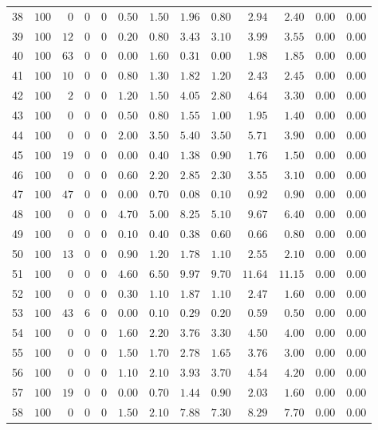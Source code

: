 \documentclass{article}
\begin{document}
\begin{landscape}
\begin{longtable}{lrrrrrrrrrrrr}
38&$100$&$ 0$&$ 0$&$ 0$&$0.50$&$1.50$&$ 1.96$&$ 0.80$&$ 2.94$&$ 2.40$&$0.00$&$0.00$\\
39&$100$&$12$&$ 0$&$ 0$&$0.20$&$0.80$&$ 3.43$&$ 3.10$&$ 3.99$&$ 3.55$&$0.00$&$0.00$\\
40&$100$&$63$&$ 0$&$ 0$&$0.00$&$1.60$&$ 0.31$&$ 0.00$&$ 1.98$&$ 1.85$&$0.00$&$0.00$\\
41&$100$&$10$&$ 0$&$ 0$&$0.80$&$1.30$&$ 1.82$&$ 1.20$&$ 2.43$&$ 2.45$&$0.00$&$0.00$\\
42&$100$&$ 2$&$ 0$&$ 0$&$1.20$&$1.50$&$ 4.05$&$ 2.80$&$ 4.64$&$ 3.30$&$0.00$&$0.00$\\
43&$100$&$ 0$&$ 0$&$ 0$&$0.50$&$0.80$&$ 1.55$&$ 1.00$&$ 1.95$&$ 1.40$&$0.00$&$0.00$\\
44&$100$&$ 0$&$ 0$&$ 0$&$2.00$&$3.50$&$ 5.40$&$ 3.50$&$ 5.71$&$ 3.90$&$0.00$&$0.00$\\
45&$100$&$19$&$ 0$&$ 0$&$0.00$&$0.40$&$ 1.38$&$ 0.90$&$ 1.76$&$ 1.50$&$0.00$&$0.00$\\
46&$100$&$ 0$&$ 0$&$ 0$&$0.60$&$2.20$&$ 2.85$&$ 2.30$&$ 3.55$&$ 3.10$&$0.00$&$0.00$\\
47&$100$&$47$&$ 0$&$ 0$&$0.00$&$0.70$&$ 0.08$&$ 0.10$&$ 0.92$&$ 0.90$&$0.00$&$0.00$\\
48&$100$&$ 0$&$ 0$&$ 0$&$4.70$&$5.00$&$ 8.25$&$ 5.10$&$ 9.67$&$ 6.40$&$0.00$&$0.00$\\
49&$100$&$ 0$&$ 0$&$ 0$&$0.10$&$0.40$&$ 0.38$&$ 0.60$&$ 0.66$&$ 0.80$&$0.00$&$0.00$\\
50&$100$&$13$&$ 0$&$ 0$&$0.90$&$1.20$&$ 1.78$&$ 1.10$&$ 2.55$&$ 2.10$&$0.00$&$0.00$\\
51&$100$&$ 0$&$ 0$&$ 0$&$4.60$&$6.50$&$ 9.97$&$ 9.70$&$11.64$&$11.15$&$0.00$&$0.00$\\
52&$100$&$ 0$&$ 0$&$ 0$&$0.30$&$1.10$&$ 1.87$&$ 1.10$&$ 2.47$&$ 1.60$&$0.00$&$0.00$\\
53&$100$&$43$&$ 6$&$ 0$&$0.00$&$0.10$&$ 0.29$&$ 0.20$&$ 0.59$&$ 0.50$&$0.00$&$0.00$\\
54&$100$&$ 0$&$ 0$&$ 0$&$1.60$&$2.20$&$ 3.76$&$ 3.30$&$ 4.50$&$ 4.00$&$0.00$&$0.00$\\
55&$100$&$ 0$&$ 0$&$ 0$&$1.50$&$1.70$&$ 2.78$&$ 1.65$&$ 3.76$&$ 3.00$&$0.00$&$0.00$\\
56&$100$&$ 0$&$ 0$&$ 0$&$1.10$&$2.10$&$ 3.93$&$ 3.70$&$ 4.54$&$ 4.20$&$0.00$&$0.00$\\
57&$100$&$19$&$ 0$&$ 0$&$0.00$&$0.70$&$ 1.44$&$ 0.90$&$ 2.03$&$ 1.60$&$0.00$&$0.00$\\
58&$100$&$ 0$&$ 0$&$ 0$&$1.50$&$2.10$&$ 7.88$&$ 7.30$&$ 8.29$&$ 7.70$&$0.00$&$0.00$\\

\end{longtable}
\end{landscape}
\end{document}
